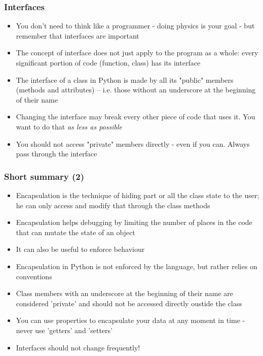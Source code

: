 \documentclass[9pt]{beamer}
\begin{document}
 
\begin{frame}
  \frametitle{Interfaces}
    
  \begin{itemize}
    \item You don't need to think like a programmer - doing physics is your goal - but
          remember that \alert{interfaces are important}
    \medskip
    \item The concept of interface does not just apply to the program as a whole:
          every significant portion of code (function, class) has its interface
    \medskip
    \item The interface of a class in Python is made by all its "public" members (methods and attributes)
          -- i.e. those without an underscore at the beginning of their name
    \medskip
    \item Changing the interface may break every other piece of code that uses it.
          You want to do that \emph{as less as possible}
    \medskip
    \item You should not access "private" members directly - even if you can. Always
          pass through the interface
    
  \end{itemize}

\end{frame}


\begin{frame}
  \frametitle{Short summary (2)}
    
  \begin{itemize}
    \small
    \item Encapsulation is the technique of hiding part or all the class state to the user; 
          he can only access and modify that through the class methods
    \medskip
    \item Encapsulation helps debugging by limiting the number of places in the code
          that can mutate the state of an object
    \medskip
    \item It can also be useful to enforce behaviour  
    \medskip
    \item Encapsulation in Python is not enforced by the language, but rather relies on conventions
    \medskip
    \item Class members with an underscore at the beginning of their name are
          considered 'private' and should not be accessed directly oustide the class
    \smallskip
    \item You can use properties to encapsulate your data at any moment in time - never use 'getters' and 'setters'
    \medskip
    \item Interfaces should not change frequently!
  \end{itemize}
  
\end{frame}
\end{document}

